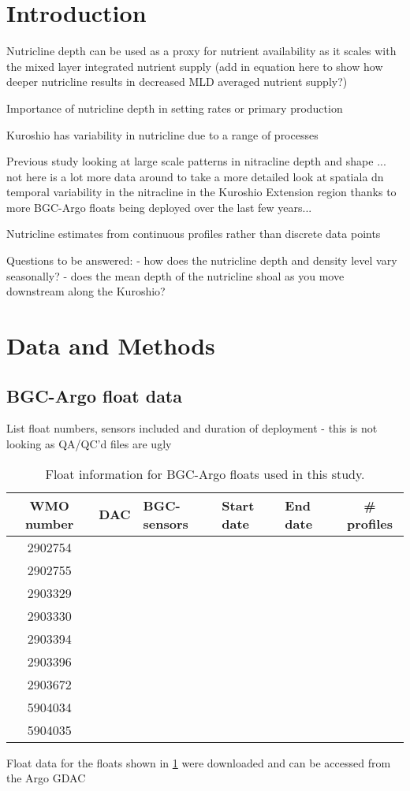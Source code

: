 \documentclass[utf8]{frontiersSCNS} %
\begin{document}
\section{Introduction}
Nutricline depth can be used as a proxy for nutrient availability as it scales with the mixed layer integrated nutrient supply (add in equation here to show how deeper nutricline results in decreased MLD averaged nutrient supply?)

Importance of nutricline depth in setting rates or primary production \citep{richardson2019vertical}

Kuroshio has variability in nutricline due to a range of processes \citep{clayton2021synoptic}

Previous study looking at large scale patterns in nitracline depth and shape \citep{omand2015shape}... not here is a lot more data around to take a more detailed look at spatiala dn temporal variability in the nitracline in the Kuroshio Extension region thanks to more BGC-Argo floats being deployed over the last few years...

Nutricline estimates from continuous profiles rather than discrete data points

Questions to be answered: 
- how does the nutricline depth and density level vary seasonally?
- does the mean depth of the nutricline shoal as you move downstream along the Kuroshio?

\section{Data and Methods}
\subsection{BGC-Argo float data}
List float numbers, sensors included and duration of deployment
- this is not looking as QA/QC'd files are ugly

\begin{table}[]
\caption{Float information for BGC-Argo floats used in this study.}
\begin{tabular}{|c|c|l|l|l|c|}
\hline
WMO number & DAC & BGC-sensors &Start date  &End date & \# profiles\\
\hline
2902754 &  &  &  &  & \\
2902755 &  &  &  &  & \\
2903329 &  &  &  &  & \\
2903330 & & & & & \\
2903394 & & & & & \\
2903396 & & & & & \\
2903672 & & & & & \\
5904034 & & & & & \\
5904035 & & & & & \\
\hline
\end{tabular}
\label{floats}
\end{table}
Float data for the floats shown in \ref{floats} were downloaded and can be accessed from  the Argo GDAC \citep{argo2022}
\end{document}
